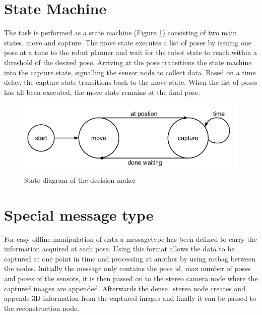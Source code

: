 
\section{State Machine}
The task is performed as a state machine (Figure \ref{fig:state_diagram}) consisting of two main states, move and capture. The move state executes a list of poses by issuing one pose at a time to the robot planner and wait for the robot state to reach within a threshold of the desired pose. Arriving at the pose transitions the state machine into the capture state, signalling the sensor node to collect data. Based on a time delay, the capture state transitions back to the move state. When the list of poses has all been executed, the move state remains at the final pose.


\begin{figure}[htb]
	\begin{center}
		\includegraphics[scale=0.5,trim=0 0 0 0]{graphics/04_decisionmaking/state_diagram.pdf}%
		\caption{State diagram of the decision maker}
		\label{fig:state_diagram}
	\end{center}
\end{figure}

\section{Special message type}
For easy offline manipulation of data a messagetype has been defined to carry the information acquired at each pose. Using this format allows the data to be captured at one point in time and processing at another by using rosbag between the nodes. Initially the message only contains the pose id, max number of poses and poses of the sensors, it is then passed on to the stereo camera node where the captured images are appended. Afterwards the dense\_stereo node creates and appends 3D information from the captured images and finally it can be passed to the reconstruction node.

